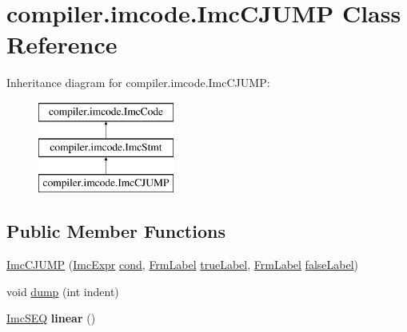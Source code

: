 \hypertarget{classcompiler_1_1imcode_1_1_imc_c_j_u_m_p}{}\section{compiler.\+imcode.\+Imc\+C\+J\+U\+MP Class Reference}
\label{classcompiler_1_1imcode_1_1_imc_c_j_u_m_p}
Inheritance diagram for compiler.\+imcode.\+Imc\+C\+J\+U\+MP\+:\begin{figure}[H]
\begin{center}
\leavevmode
\includegraphics[height=3.000000cm]{classcompiler_1_1imcode_1_1_imc_c_j_u_m_p}
\end{center}
\end{figure}
\subsection*{Public Member Functions}
\begin{DoxyCompactItemize}
\item 
\hyperlink{classcompiler_1_1imcode_1_1_imc_c_j_u_m_p_a118e178659acfad7a782e510e326b694}{Imc\+C\+J\+U\+MP} (\hyperlink{classcompiler_1_1imcode_1_1_imc_expr}{Imc\+Expr} \hyperlink{classcompiler_1_1imcode_1_1_imc_c_j_u_m_p_aa060cb5ff22920eee2e7a16b9252e238}{cond}, \hyperlink{classcompiler_1_1frames_1_1_frm_label}{Frm\+Label} \hyperlink{classcompiler_1_1imcode_1_1_imc_c_j_u_m_p_afe718affa055b0d5fa58cb5011024adf}{true\+Label}, \hyperlink{classcompiler_1_1frames_1_1_frm_label}{Frm\+Label} \hyperlink{classcompiler_1_1imcode_1_1_imc_c_j_u_m_p_acf48b9439d6099fa19f10c96d2852613}{false\+Label})
\item 
void \hyperlink{classcompiler_1_1imcode_1_1_imc_c_j_u_m_p_a6930d2d0a3732f608226b60579384b4e}{dump} (int indent)
\item 
\mbox{\label{classcompiler_1_1imcode_1_1_imc_c_j_u_m_p_a005217bf33dd63444fedb18d7b89f080}} 
\hyperlink{classcompiler_1_1imcode_1_1_imc_s_e_q}{Imc\+S\+EQ} {\bfseries linear} ()
\end{DoxyCompactItemize}
